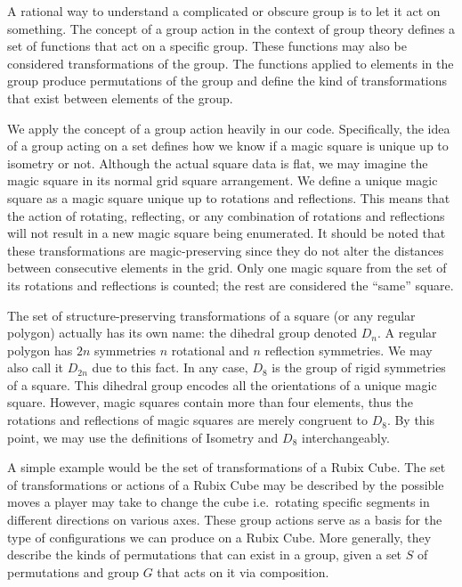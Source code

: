 \documentclass{rhumj_new}
\begin{document}
A rational way to understand a complicated or obscure group is to let it act on something. The
concept of a group action in the context of group theory defines a set of functions that act on a
specific group. These functions may also be considered transformations of the group. The functions
applied to elements in the group produce permutations of the group and define the kind of
transformations that exist between elements of the group.


We apply the concept of a group action heavily in our code. Specifically, the idea of a group
acting on a set defines how we know if a magic square is unique up to isometry or not. Although the
actual square data is flat, we may imagine the magic square in its normal grid square arrangement.
We define a unique magic square as a magic square unique up to rotations and reflections. This
means that the action of rotating, reflecting, or any combination of rotations and reflections will
not result in a new magic square being enumerated. It should be noted that these transformations
are magic-preserving since they do not alter the distances between consecutive elements in the
grid. Only one magic square from the set of its rotations and reflections is counted; the rest are
considered the ``same'' square.

The set of structure-preserving transformations of a square (or any regular polygon) actually has
its own name: the dihedral group denoted $D_n$. A regular polygon has $2n$ symmetries \textemdash{}
$n$ rotational and $n$ reflection symmetries. We may also call it $D_{2n}$ due to this fact. In any
case, $D_8$ is the group of rigid symmetries of a square. This dihedral group encodes all the
orientations of a unique magic square. However, magic squares contain more than four elements, thus
the rotations and reflections of magic squares are merely congruent to $D_8$. By this point, we may
use the definitions of Isometry and $D_8$ interchangeably.

A simple example would be the set of transformations of a Rubix Cube. The set of transformations or
actions of a Rubix Cube may be described by the possible moves a player may take to change the cube
i.e.\ rotating specific segments in different directions on various axes. These group actions serve
as a basis for the type of configurations we can produce on a Rubix Cube. More generally, they
describe the kinds of permutations that can exist in a group, given a set $S$ of permutations and
group $G$ that acts on it via composition.
\end{document}
